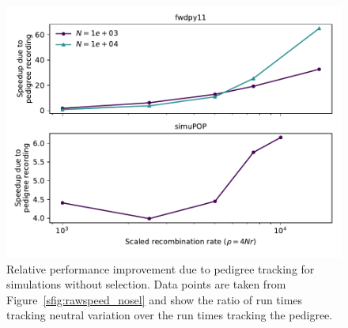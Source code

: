 \documentclass{article}
\begin{document}
\begin{figure}
    \includegraphics[]{sims/speedup_nosel}
    \caption{\label{sfig:speedup_nosel}Relative performance improvement due to pedigree tracking for simulations without
    selection.  Data points are taken from Figure~\ref{sfig:rawspeed_nosel} and show the ratio of run times tracking
neutral variation over the run times tracking the pedigree.}
\end{figure}
\end{document}
